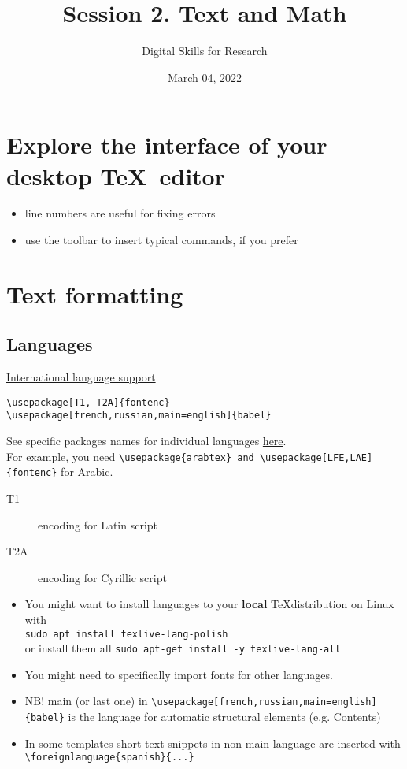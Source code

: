 \documentclass[a4paper,11pt,leqno]{article}
\title{Session 2. Text and Math}
\author{Digital Skills for Research}
\date{March 04, 2022}
\begin{document}
\maketitle
\tableofcontents

\section{Explore the interface of your desktop \TeX~editor}

\begin{itemize}
	\item line numbers are useful for fixing errors
	\item use the toolbar to insert typical commands, if you prefer
\end{itemize}

\section{Text formatting}


\subsection{Languages}

 \href{https://www.overleaf.com/learn/latex/International_language_support}{International language support}

\begin{lstlisting}[breaklines]
\usepackage[T1, T2A]{fontenc}
\usepackage[french,russian,main=english]{babel}
\end{lstlisting}

See specific packages names for individual languages \href{https://github.com/kunilovskaya/dskills_workshop/tree/main/alphabets}{here}. \\ For example, you need \verb|\usepackage{arabtex} and \usepackage[LFE,LAE]{fontenc}| for Arabic.

\begin{description}
	\item[T1] encoding for Latin script
	\item[T2A] encoding for Cyrillic script
\end{description}

\begin{itemize}
	\item You might want to install languages to your \textbf{local} \TeX distribution on Linux with \\ \verb|sudo apt install texlive-lang-polish| \\
	or install them all \verb|sudo apt-get install -y texlive-lang-all|

	\item You might need to specifically import fonts for other languages.
	\item NB! main (or last one) in \verb|\usepackage[french,russian,main=english]{babel}| is the language for automatic structural elements (e.g. Contents)
	\item In some templates short text snippets in non-main language are inserted with
	\verb|\foreignlanguage{spanish}{...}| 
\end{itemize}
\end{document}
